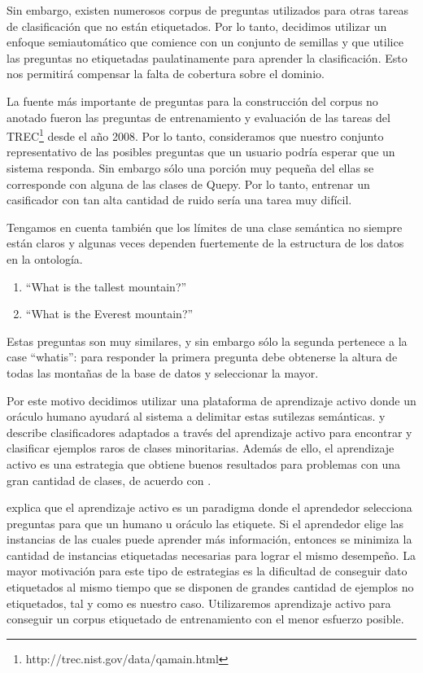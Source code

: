 Sin embargo, existen numerosos corpus de preguntas utilizados para otras tareas de clasificación que no están etiquetados. Por lo tanto, decidimos utilizar un enfoque semiautomático que comience con un conjunto de semillas y que utilice las preguntas no etiquetadas paulatinamente para aprender la clasificación. Esto nos permitirá compensar la falta de cobertura sobre el dominio.

La fuente más importante de preguntas para la construcción del corpus no anotado fueron las preguntas de entrenamiento y evaluación de las tareas del TREC\footnote{http://trec.nist.gov/data/qamain.html} desde el año 2008. Por lo tanto, consideramos que nuestro conjunto representativo de las posibles preguntas que un usuario podría esperar que un sistema responda. Sin embargo sólo una porción muy pequeña del ellas se corresponde con alguna de las clases de Quepy. Por lo tanto, entrenar un casificador con tan alta cantidad de ruido sería una tarea muy difícil.

Tengamos en cuenta también que los límites de una clase semántica no siempre están claros y algunas veces dependen fuertemente de la estructura de los datos en la ontología.

\begin{example}\label{preguntas-similares}\hfill
    \begin{enumerate}
    \item ``What is the tallest mountain?''
    \item ``What is the Everest mountain?''
    \end{enumerate}
\end{example}

Estas preguntas son muy similares, y sin embargo sólo la segunda pertenece a la case ``whatis'': para responder la primera pregunta debe obtenerse la altura de todas las montañas de la base de datos y seleccionar la mayor.

Por este motivo decidimos utilizar una plataforma de aprendizaje activo donde un oráculo humano ayudará al sistema a delimitar estas sutilezas semánticas. \citet{rare-classes-holpedales} y \citet{AL-imbalanced-Ertekin} describe clasificadores adaptados a través del aprendizaje activo para encontrar y clasificar ejemplos raros de clases minoritarias. Además de ello, el aprendizaje activo es una estrategia que obtiene buenos resultados para problemas con una gran cantidad de clases, de acuerdo con \citet{al-multiclass-jain}.

\citet{settles_active_learning_survey} explica que el aprendizaje activo es un paradigma donde el aprendedor selecciona preguntas para que un humano u oráculo las etiquete. Si el aprendedor elige las instancias de las cuales puede aprender más información, entonces se minimiza la cantidad de instancias etiquetadas necesarias para lograr el mismo desempeño. La mayor motivación para este tipo de estrategias es la dificultad de conseguir dato etiquetados al mismo tiempo que se disponen de grandes cantidad de ejemplos no etiquetados, tal y como es nuestro caso. Utilizaremos aprendizaje activo para conseguir un corpus etiquetado de entrenamiento con el menor esfuerzo posible.

